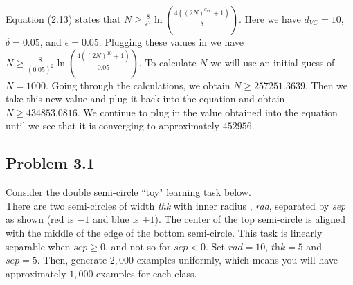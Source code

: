 \documentclass[a4paper]{article}
\begin{document}
Equation (2.13) states that $N \geq \frac{8}{\epsilon^2} \ln \left(\frac{4((2N)^{d_{VC}} + 1)}
{\delta}\right)$.  Here we have $d_{VC} = 10$, $\delta = 0.05$, and $\epsilon = 0.05$.  Plugging 
these values in we have $N \geq \frac{8}{(0.05)^2} \ln \left(\frac{4((2N)^{10} + 1)}{0.05}
\right)$.  To calculate $N$ we will use an initial guess of $N = 1000$.  Going through the 
calculations, we obtain $N \geq 257251.3639$.  Then we take this new value and plug it back into 
the equation and obtain $N \geq 434853.0816$.  We continue to plug in the value obtained into 
the equation until we see that it is converging to approximately $452956$.


\subsection{Problem 3.1} Consider the double semi-circle ``toy" learning task below.\\
There are two semi-circles of width \textit{thk} with inner radius , \textit{rad}, 
separated by \textit{sep} as shown (red is $-1$ and blue is $+1$).  The center of the 
top semi-circle is aligned with the middle of the edge of the bottom semi-circle.  This 
task is linearly separable when $\textit{sep} \geq 0$, and not so for $\textit{sep} < 0$.  
Set $\textit{rad} = 10$, $\textit{thk} = 5$ and $\textit{sep} = 5$.  Then, generate $2,000$ 
examples uniformly, which means you will have approximately $1,000$ examples for each class.
\end{document}
